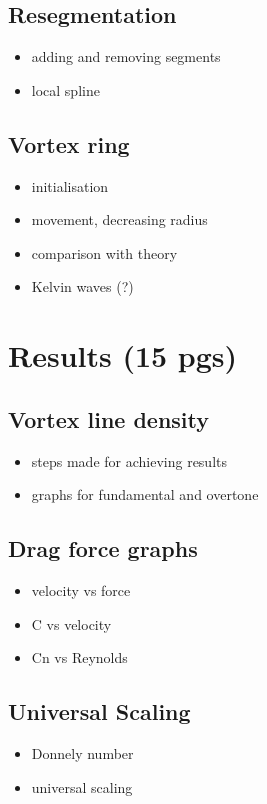 \documentclass[a4paper, 12pt]{report}
\newcommand{\<}{\langle} %
\renewcommand{\>}{\rangle} %
\begin{document}
\section{Resegmentation}
\begin{itemize}
	\item adding and removing segments
	\item local spline
\end{itemize}

\section{Vortex ring}
\begin{itemize}
	\item initialisation
	\item movement, decreasing radius
	\item comparison with theory
	\item Kelvin waves (?)
\end{itemize}

\newpage

\chapter{Results (15 pgs)}

\section{Vortex line density}
\begin{itemize}
	\item steps made for achieving results
	\item graphs for fundamental and overtone
\end{itemize}

\section{Drag force graphs}
\begin{itemize}
	\item velocity vs force
	\item C vs velocity
	\item Cn vs Reynolds
\end{itemize}

\section{Universal Scaling}
\begin{itemize}
	\item Donnely number
	\item universal scaling
\end{itemize}
\end{document}
